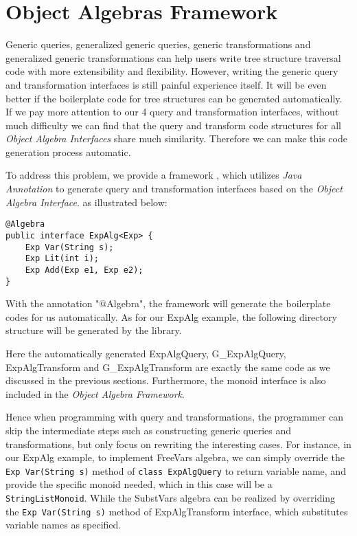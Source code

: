 \section{Object Algebras Framework}

Generic queries, generalized generic queries, generic transformations and generalized generic transformations can help users write tree structure traversal code with more extensibility and flexibility. However, writing the generic query and transformation interfaces is still painful experience itself. It will be even better if the boilerplate code for tree structures can be generated automatically. If we pay more attention to our 4 query and transformation interfaces, without much difficulty we can find that the query and transform code structures for all \emph{Object Algebra Interfaces} share much similarity. Therefore we can make this code generation process automatic. 

To address this problem, we provide a framework \name, which utilizes \emph{Java Annotation} to generate query and transformation interfaces based on the \emph{Object Algebra Interface}. as illustrated below: 
\begin{lstlisting}[numbers=none] 
@Algebra
public interface ExpAlg<Exp> {
	Exp Var(String s);
	Exp Lit(int i);
	Exp Add(Exp e1, Exp e2);
}
\end{lstlisting}

With the annotation "$@$Algebra", the framework will generate the boilerplate codes for us automatically. As for our ExpAlg example, the following directory structure will be generated by the library. 

Here the automatically generated ExpAlgQuery, G\_ExpAlgQuery, ExpAlgTransform and G\_ExpAlgTransform are exactly the same code as we discussed in the previous sections. Furthermore, the monoid interface is also included in the \emph{Object Algebra Framework}.

Hence when programming with query and transformations, the programmer can skip the intermediate steps such as constructing generic queries and transformations, but only focus on rewriting the interesting cases. For instance, in our ExpAlg example, to implement FreeVars algebra, we can simply override the \lstinline{Exp Var(String s)} method of \lstinline{class ExpAlgQuery} to return variable name, and provide the specific monoid needed, which in this case will be a \lstinline{StringListMonoid}. While the SubstVars algebra can be realized by overriding the \lstinline{Exp Var(String s)} method of ExpAlgTransform interface, which substitutes variable names as specified. 
